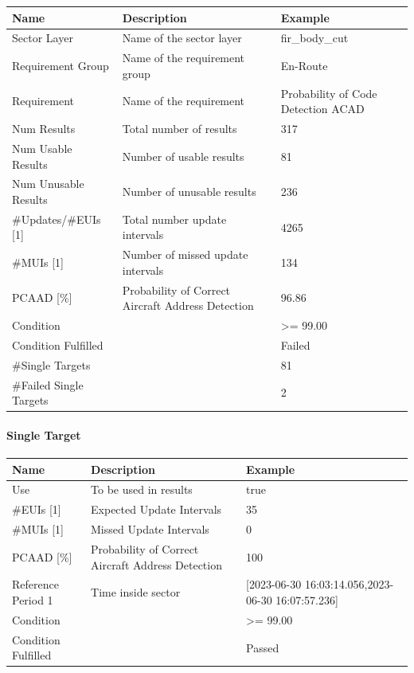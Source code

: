 \begin{center}
 \begin{table}[H]
  \begin{tabularx}{\textwidth}{ | l | X |  l | }
    \hline
    \textbf{Name} & \textbf{Description} & \textbf{Example} \\ \hline
    Sector Layer & Name of the sector layer & fir\_body\_cut \\ \hline
    Requirement Group & Name of the requirement group & En-Route \\ \hline
    Requirement & Name of the requirement & Probability of Code Detection ACAD \\ \hline
    Num Results & Total number of results & 317 \\ \hline
    Num Usable Results & Number of usable results & 81 \\ \hline
    Num Unusable Results & Number of unusable results & 236 \\ \hline
    \#Updates/\#EUIs [1] & Total number update intervals & 4265 \\ \hline
    \#MUIs [1] & Number of missed update intervals & 134 \\ \hline
    PCAAD [\%] & Probability of Correct Aircraft Address Detection & 96.86 \\ \hline
    Condition &  & >= 99.00 \\ \hline
    Condition Fulfilled &  & Failed \\ \hline
    \#Single Targets &  & 81 \\ \hline
    \#Failed Single Targets &  & 2 \\ \hline
\end{tabularx}
\end{table}
\end{center}

\paragraph{Single Target}

\begin{center}
 \begin{table}[H]
  \begin{tabularx}{\textwidth}{ | l | X |  l | }
    \hline
    \textbf{Name} & \textbf{Description} & \textbf{Example} \\ \hline
    Use & To be used in results & true \\ \hline
    \#EUIs [1] & Expected Update Intervals & 35 \\ \hline
    \#MUIs [1] & Missed Update Intervals & 0 \\ \hline
    PCAAD [\%] & Probability of Correct Aircraft Address Detection & 100 \\ \hline
    Reference Period 1 & Time inside sector & [2023-06-30 16:03:14.056,2023-06-30 16:07:57.236] \\ \hline
    Condition &  & >= 99.00 \\ \hline
    Condition Fulfilled &  & Passed \\ \hline
\end{tabularx}
\end{table}
\end{center}

